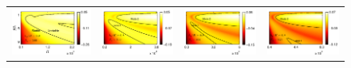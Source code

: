 \documentclass[aps,prl,twocolumn,showpacs,superscriptaddress,groupedaddress,10pt]{revtex4-1}  %
\begin{document}
\begin{figure}
\begin{tabular}{cccc}
{\includegraphics[scale = 0.72]{Set4_dens28_imgsc}} &
{\includegraphics[scale = 0.72]{Set4_dens30_imgsc}} &
{\includegraphics[scale = 0.72]{Set4_dens32_imgsc}} &
{\includegraphics[scale = 0.72]{Set4_dens34_imgsc}} \\

\end{tabular}
\end{figure}
\end{document}
